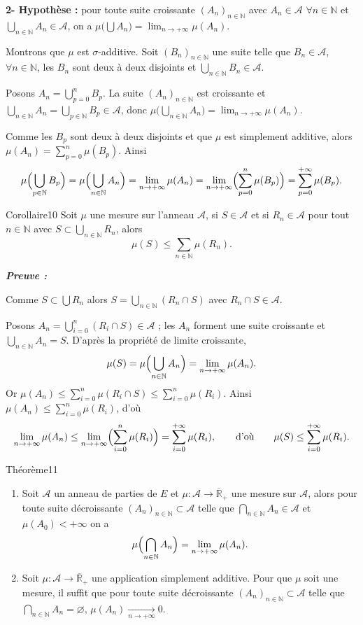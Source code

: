 \documentclass[11pt,a4paper]{article}
\newcommand{\N}{\mathbb{N}}
\newcommand{\Rb}{\overline{\mathbb{R}}}
\newcommand{\A}{\mathscr{A}}
\newenvironment{preuve}{\par\textit{\textbf{Preuve :}}\par\nopagebreak[4]}{\par}
\begin{document}
\textbf{2- Hypothèse :} pour toute suite croissante $(A_n)_{n\in\N}$ avec $A_n\in\A$ $\forall n\in\N$ et $\bigcup_{n\in\N}A_n\in\A$, on a
$\mu\bigl(\bigcup A_n\bigr)=\lim_{n\to+\infty}\mu(A_n)$.

Montrons que $\mu$ est $\sigma$-additive. Soit $(B_n)_{n\in\N}$ une suite telle que $B_n\in\A$, $\forall n\in\N$, les $B_n$ sont deux à deux disjoints
et $\bigcup_{n\in\N}B_n\in\A$.

Posons $A_n=\bigcup_{p=0}^{n}B_p$. La suite $(A_n)_{n\in\N}$ est croissante et $\bigcup_{n\in\N}A_n=\bigcup_{p\in\N}B_p\in\A$,
donc $\mu\bigl(\bigcup_{n\in\N}A_n\bigr)=\lim_{n\to+\infty}\mu(A_n)$.

Comme les $B_p$ sont deux à deux disjoints et que $\mu$ est simplement additive, alors $\mu(A_n)=\sum_{p=0}^{n}\mu(B_p)$. Ainsi
\[
  \mu\Bigl(\bigcup_{p\in\N}B_p\Bigr)=\mu\Bigl(\bigcup_{n\in\N}A_n\Bigr)=\lim_{n\to+\infty}\mu(A_n)
  =\lim_{n\to+\infty}\Bigl(\sum_{p=0}^{n}\mu(B_p)\Bigr)=\sum_{p=0}^{+\infty}\mu(B_p).
\]

\begin{enonce}{Corollaire}{10}
Soit $\mu$ une mesure sur l'anneau $\A$, si $S\in\A$ et si $R_n\in\A$ pour tout $n\in\N$ avec $S\subset\bigcup_{n\in\N}R_n$, alors
\[
  \mu(S)\le\sum_{n\in\N}\mu(R_n).
\]
\end{enonce}

\begin{preuve}\end{preuve}
Comme $S\subset\bigcup R_n$ alors $S=\bigcup_{n\in\N}(R_n\cap S)$ avec $R_n\cap S\in\A$.

Posons $A_n=\bigcup_{i=0}^{n}(R_i\cap S)\in\A$ ; les $A_n$ forment une suite croissante et $\bigcup_{n\in\N}A_n=S$.
D'après la propriété de limite croissante,
\[
  \mu(S)=\mu\Bigl(\bigcup_{n\in\N}A_n\Bigr)=\lim_{n\to+\infty}\mu(A_n).
\]
Or $\mu(A_n)\le\sum_{i=0}^{n}\mu(R_i\cap S)\le\sum_{i=0}^{n}\mu(R_i)$. Ainsi $\mu(A_n)\le\sum_{i=0}^{n}\mu(R_i)$,
d'où
\[
  \lim_{n\to+\infty}\mu(A_n)\le\lim_{n\to+\infty}\Bigl(\sum_{i=0}^{n}\mu(R_i)\Bigr)=\sum_{i=0}^{+\infty}\mu(R_i),
  \qquad\text{d'où}\qquad \mu(S)\le\sum_{i=0}^{+\infty}\mu(R_i).
\]

\begin{enonce}{Théorème}{11}
\begin{enumerate}[label=\textbf{\arabic*-},leftmargin=1.2cm]
  \item Soit $\A$ un anneau de parties de $E$ et $\mu:\A\to\Rb_+$ une mesure sur $\A$, alors pour toute suite décroissante
        $(A_n)_{n\in\N}\subset\A$ telle que $\bigcap_{n\in\N}A_n\in\A$ et $\mu(A_0)<+\infty$ on a
        \[
          \mu\Bigl(\bigcap_{n\in\N}A_n\Bigr)=\lim_{n\to+\infty}\mu(A_n).
        \]
  \item Soit $\mu:\A\to\Rb_+$ une application simplement additive. Pour que $\mu$ soit une mesure, il suffit que pour toute suite décroissante
        $(A_n)_{n\in\N}\subset\A$ telle que $\bigcap_{n\in\N}A_n=\varnothing$, $\mu(A_n)\xrightarrow[n\to+\infty]{}0$.
\end{enumerate}
\end{enonce}
\end{document}

